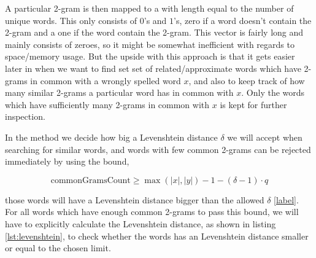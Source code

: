 A particular 2-gram is then mapped to a  with length equal to the number of unique words. This  only consists of \(0\)'s and \(1\)'s, zero if a word doesn't contain the 2-gram and a one if the word contain the 2-gram.
This vector is fairly long and mainly consists of zeroes, so it might be somewhat inefficient with regards to space/memory usage. 
But the upside with this approach is that it gets easier later in  when we want to find set set of related/approximate words which have 2-grams in common with a wrongly spelled word \(x\), and also to keep track of how many similar 2-grams a particular word has in common with \(x\). Only the words which have sufficiently many 2-grams in common with \(x\) is kept for further inspection. 

In the  method we decide how big a Levenshtein distance \(\delta\) we will accept when searching for similar words, and words with few common 2-grams can be rejected immediately by using the bound,

\[ \text{commonGramsCount} \geq \max{(|x|, |y|) - 1 - (\delta -1 ) \cdot q } \]   

those words will have a Levenshtein distance bigger than the allowed \(\delta\) \ref{label}.  
For all words which have enough common 2-grams to pass this bound, we will have to explicitly calculate the Levenshtein distance, as shown in listing \ref{lst:levenshtein}, to check whether the words has an Levenshtein distance smaller or equal to the chosen limit. 



